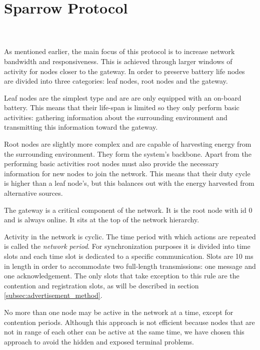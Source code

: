 
\chapter{Sparrow Protocol}

\\
\\

As mentioned earlier, the main focus of this protocol is to increase network
bandwidth and responsiveness. This is achieved through larger windows of
activity for nodes closer to the gateway. In order to preserve battery life
nodes are divided into three categories: leaf nodes, root nodes and the
gateway. 

Leaf nodes are the simplest type and are are only equipped with an
on-board battery. This means that their life-span is limited so they 
only perform basic activities: gathering information about the surrounding
environment and transmitting this information toward the gateway. 

Root nodes are slightly more complex and are capable of harvesting energy from
the surrounding environment. They form the system's backbone. Apart from the
performing basic activities root nodes must also provide the necessary
information for new nodes to join the network. This means that their duty cycle
is higher than a leaf node's, but this balances out with the energy harvested
from alternative sources.

The gateway is a critical component of the network. It is the root node with id
0 and is always online. It sits at the top of the network hierarchy.

Activity in the network is cyclic. The time period with which actions are
repeated is called the \emph{network period}. For synchronization purposes it
is divided into time slots and each time slot is dedicated to a specific
communication. Slots are 10 ms in length in order to accommodate two
full-length transmissions: one message and one acknowledgement. The only slots
that take exception to this rule are the contention and registration slots, as
will be described in section \ref{subsec:advertisement_method}. 

No more than one node may be active in the network at a time, except for
contention periods. Although this approach is not efficient because nodes that
are not in range of each other can be active at the same time, we have chosen
this approach to avoid the hidden and exposed terminal problems. 

